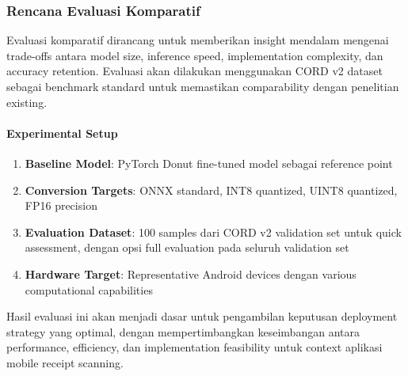 \subsubsection{Rencana Evaluasi Komparatif}
\label{subsubsec:rencana-evaluasi-komparatif}

Evaluasi komparatif dirancang untuk memberikan insight mendalam mengenai trade-offs antara model size, inference speed, implementation complexity, dan accuracy retention. Evaluasi akan dilakukan menggunakan CORD v2 dataset sebagai benchmark standard untuk memastikan comparability dengan penelitian existing.

\paragraph{Experimental Setup}
\begin{enumerate}
    \item \textbf{Baseline Model}: PyTorch Donut fine-tuned model sebagai reference point
    \item \textbf{Conversion Targets}: ONNX standard, INT8 quantized, UINT8 quantized, FP16 precision
    \item \textbf{Evaluation Dataset}: 100 samples dari CORD v2 validation set untuk quick assessment, dengan opsi full evaluation pada seluruh validation set
    \item \textbf{Hardware Target}: Representative Android devices dengan various computational capabilities
\end{enumerate}

Hasil evaluasi ini akan menjadi dasar untuk pengambilan keputusan deployment strategy yang optimal, dengan mempertimbangkan keseimbangan antara performance, efficiency, dan implementation feasibility untuk context aplikasi mobile receipt scanning.